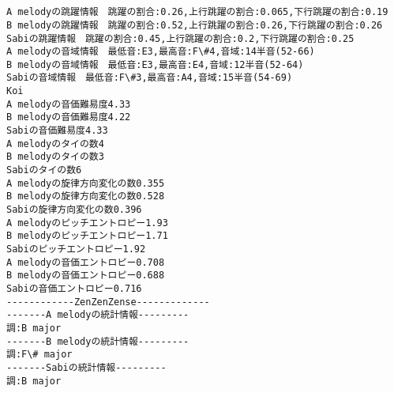 \documentclass[11pt]{article}
\begin{document}
    \begin{center}
    \end{center}
    { \hspace*{\fill} \\}
    
    \begin{center}
    \end{center}
    { \hspace*{\fill} \\}
    
    \begin{Verbatim}[commandchars=\\\{\}]
A melodyの跳躍情報　跳躍の割合:0.26,上行跳躍の割合:0.065,下行跳躍の割合:0.19
B melodyの跳躍情報　跳躍の割合:0.52,上行跳躍の割合:0.26,下行跳躍の割合:0.26
Sabiの跳躍情報　跳躍の割合:0.45,上行跳躍の割合:0.2,下行跳躍の割合:0.25
A melodyの音域情報　最低音:E3,最高音:F\#4,音域:14半音(52-66)
B melodyの音域情報　最低音:E3,最高音:E4,音域:12半音(52-64)
Sabiの音域情報　最低音:F\#3,最高音:A4,音域:15半音(54-69)
Koi
A melodyの音価難易度4.33
B melodyの音価難易度4.22
Sabiの音価難易度4.33
A melodyのタイの数4
B melodyのタイの数3
Sabiのタイの数6
A melodyの旋律方向変化の数0.355
B melodyの旋律方向変化の数0.528
Sabiの旋律方向変化の数0.396
A melodyのピッチエントロピー1.93
B melodyのピッチエントロピー1.71
Sabiのピッチエントロピー1.92
A melodyの音価エントロピー0.708
B melodyの音価エントロピー0.688
Sabiの音価エントロピー0.716
------------ZenZenZense-------------
-------A melodyの統計情報---------
調:B major
-------B melodyの統計情報---------
調:F\# major
-------Sabiの統計情報---------
調:B major

    \end{Verbatim}

    \begin{center}
    \end{center}
    { \hspace*{\fill} \\}
    
    \begin{center}
    \end{center}
    { \hspace*{\fill} \\}
    
\end{document}
